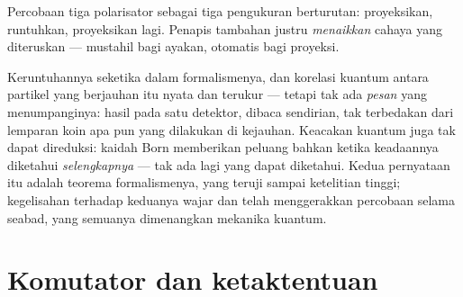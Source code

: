 \begin{omfigure}

{\small Percobaan tiga polarisator sebagai tiga pengukuran berturutan:
proyeksikan, runtuhkan, proyeksikan lagi. Penapis tambahan justru
\emph{menaikkan} cahaya yang diteruskan --- mustahil bagi ayakan,
otomatis bagi proyeksi.}
\end{omfigure}

\begin{remark}\label{rem:b3:quantum-formalism:nosignal}
Keruntuhannya seketika dalam formalismenya, dan korelasi kuantum antara
partikel yang berjauhan itu nyata dan terukur --- tetapi tak ada
\emph{pesan} yang menumpanginya: hasil pada satu detektor, dibaca
sendirian, tak terbedakan dari lemparan koin apa pun yang dilakukan di
kejauhan. Keacakan kuantum juga tak dapat direduksi: kaidah Born
memberikan peluang bahkan ketika keadaannya diketahui
\emph{selengkapnya} --- tak ada lagi yang dapat diketahui. Kedua
pernyataan itu adalah teorema formalismenya, yang teruji sampai
ketelitian tinggi; kegelisahan terhadap keduanya wajar dan telah
menggerakkan percobaan selama seabad, yang semuanya dimenangkan mekanika
kuantum.
\end{remark}

\section{Komutator dan ketaktentuan}

